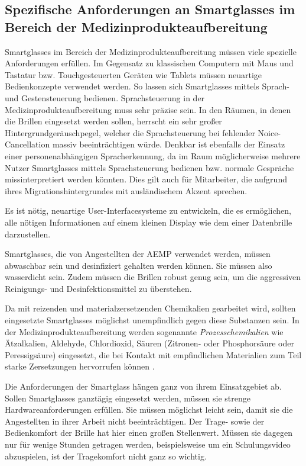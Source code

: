 \subsection{Spezifische Anforderungen an Smartglasses im Bereich der Medizinprodukteaufbereitung}
\label{sec:Spezifische_Anforderungen_an_Smartglasses}
Smartglasses im Bereich der Medizinprodukteaufbereitung müssen viele spezielle Anforderungen erfüllen. Im Gegensatz zu klassischen Computern mit Maus und Tastatur bzw. Touchgesteuerten Geräten wie Tablets müssen neuartige Bedienkonzepte verwendet werden. So lassen sich Smartglasses mittels Sprach- und Gestensteuerung bedienen.
Sprachsteuerung in der Medizinprodukteaufbereitung muss sehr präzise sein. In den Räumen, in denen die Brillen eingesetzt werden sollen, herrscht ein sehr großer Hintergrundgeräuschpegel, welcher die Sprachsteuerung bei fehlender Noice-Cancellation massiv beeinträchtigen würde. Denkbar ist ebenfalls der Einsatz einer personenabhängigen Spracherkennung, da im Raum möglicherweise mehrere Nutzer Smartglasses mittels Sprachsteuerung bedienen bzw. normale Gespräche missinterpretiert werden könnten. Dies gilt auch für Mitarbeiter, die aufgrund ihres Migrationshintergrundes mit ausländischem Akzent sprechen.
 
Es ist nötig, neuartige User-Interfacesysteme zu entwickeln, die es ermöglichen, alle nötigen Informationen auf einem kleinen Display wie dem einer Datenbrille darzustellen. 

Smartglasses, die von Angestellten der AEMP verwendet werden, müssen abwaschbar sein und desinfiziert gehalten werden können. Sie müssen also wasserdicht sein. Zudem müssen die Brillen robust genug sein, um die aggressiven Reinigungs- und Desinfektionsmittel zu überstehen.

Da mit reizenden und materialzersetzenden Chemikalien gearbeitet wird, sollten eingesetzte Smartglasses möglichst unempfindlich gegen diese Substanzen sein. In der Medizinprodukteaufbereitung werden sogenannte \emph{Prozesschemikalien} wie Ätzalkalien, Aldehyde, Chlordioxid, Säuren (Zitronen- oder Phosphorsäure oder Peressigsäure) eingesetzt, die bei Kontakt mit empfindlichen Materialien zum Teil starke Zersetzungen hervorrufen können \cite{AKI-ArbeitskreisInstrumenten-Aufbereitung2012}.

Die Anforderungen der Smartglass hängen ganz von ihrem Einsatzgebiet ab. Sollen Smartglasses ganztägig eingesetzt werden, müssen sie strenge Hardwareanforderungen erfüllen. Sie müssen möglichst leicht sein, damit sie die Angestellten in ihrer Arbeit nicht beeinträchtigen. Der Trage- sowie der Bedienkomfort der Brille hat hier einen großen Stellenwert. Müssen sie dagegen nur für wenige Stunden getragen werden, beispielsweise um ein Schulungsvideo abzuspielen, ist der Tragekomfort nicht ganz so wichtig.

